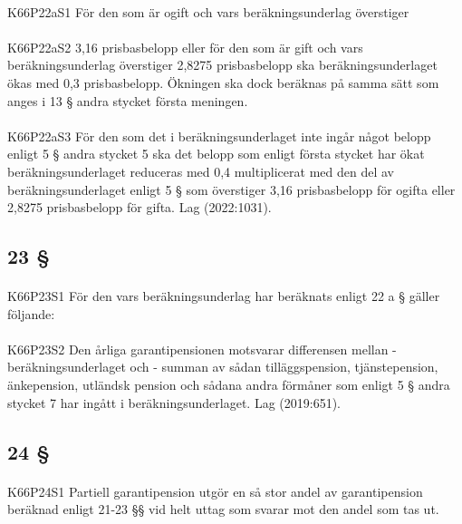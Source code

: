 \documentclass[a4paper,notitlepage,openany,10pt]{book}
\begin{document}
\paragraph*{}
{\tiny K66P22aS1}
För den som är ogift och vars beräkningsunderlag överstiger
\paragraph*{}
{\tiny K66P22aS2}
3,16 prisbasbelopp eller för den som är gift och vars beräkningsunderlag överstiger 2,8275 prisbasbelopp ska beräkningsunderlaget ökas med 0,3 prisbasbelopp. Ökningen ska dock beräknas på samma sätt som anges i 13 § andra stycket första meningen.
\paragraph*{}
{\tiny K66P22aS3}
För den som det i beräkningsunderlaget inte ingår något belopp enligt 5 § andra stycket 5 ska det belopp som enligt första stycket har ökat beräkningsunderlaget reduceras med 0,4 multiplicerat med den del av beräkningsunderlaget enligt 5 § som överstiger 3,16 prisbasbelopp för ogifta eller 2,8275 prisbasbelopp för gifta.
Lag (2022:1031).
\subsection*{23 §}
\paragraph*{}
{\tiny K66P23S1}
För den vars beräkningsunderlag har beräknats enligt 22 a § gäller följande:
\paragraph*{}
{\tiny K66P23S2}
Den årliga garantipensionen motsvarar differensen mellan
\newline - beräkningsunderlaget och
\newline - summan av sådan tilläggspension, tjänstepension, änkepension, utländsk pension och sådana andra förmåner som enligt 5 § andra stycket 7 har ingått i beräkningsunderlaget.
Lag (2019:651).
\subsection*{24 §}
\paragraph*{}
{\tiny K66P24S1}
Partiell garantipension utgör en så stor andel av garantipension beräknad enligt 21-23 §§ vid helt uttag som svarar mot den andel som tas ut.
\end{document}
